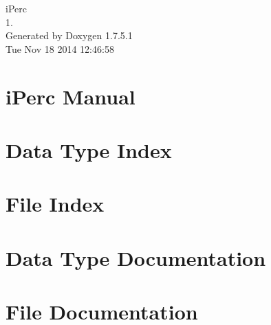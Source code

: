 \documentclass[a4paper]{book}
\begin{document}
\hypersetup{pageanchor=false,citecolor=blue}
\begin{titlepage}
\vspace*{7cm}
\begin{center}
{\Large i\-Perc \\[1ex]\large 1. }\\
\vspace*{1cm}
{\large \-Generated by Doxygen 1.7.5.1}\\
\vspace*{0.5cm}
{\small Tue Nov 18 2014 12:46:58}\\
\end{center}
\end{titlepage}
\clearemptydoublepage
{}
\tableofcontents
\clearemptydoublepage
{}
\hypersetup{pageanchor=true,citecolor=blue}
\chapter{i\-Perc \-Manual}
\label{index}\hypertarget{index}{}
\chapter{\-Data \-Type \-Index}

\chapter{\-File \-Index}

\chapter{\-Data \-Type \-Documentation}











\chapter{\-File \-Documentation}
















\printindex
\end{document}
